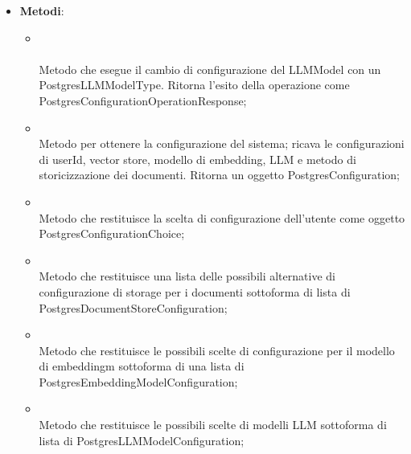 \documentclass[10pt, a4paper]{article}
\begin{document}
    \label{PostgresConfigurationORMDettaglio}
    \begin{itemize}
        \item \textbf{Metodi}:
        \begin{itemize}
            \item {}\\ \\
            Metodo che esegue il cambio di configurazione del LLMModel con un PostgresLLMModelType. Ritorna l'esito della operazione come PostgresConfigurationOperationResponse;

            \item {}\\
            Metodo per ottenere la configurazione del sistema; ricava le configurazioni di userId, vector store, modello di embedding, LLM e metodo di storicizzazione dei documenti. Ritorna un oggetto PostgresConfiguration;
            
            \item {}\\
            Metodo che restituisce la scelta di configurazione dell'utente come oggetto PostgresConfigurationChoice;

            \item {}\\
            Metodo che restituisce una lista delle possibili alternative di configurazione di storage per i documenti sottoforma di lista di PostgresDocumentStoreConfiguration;

            \item {}\\
            Metodo che restituisce le possibili scelte di configurazione per il modello di embeddingm sottoforma di una lista di PostgresEmbeddingModelConfiguration;

            \item {}\\
            Metodo che restituisce le possibili scelte di modelli LLM sottoforma di  lista di PostgresLLMModelConfiguration;


\end{itemize}
\end{itemize}
\end{document}
